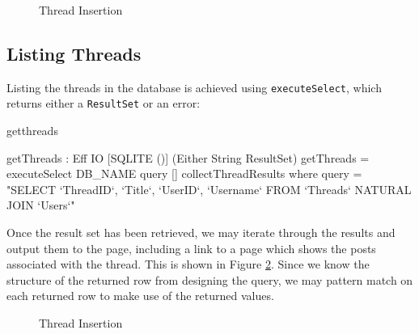 \begin{figure}[h]
\caption{Thread Insertion}
\label{fig:threadins}
\end{figure}

\subsection{Listing Threads}

Listing the threads in the database is achieved using 
\texttt{executeSelect}, which returns either a
\texttt{ResultSet} or an error:

\begin{SaveVerbatim}{getthreads}

getThreads : Eff IO [SQLITE ()] (Either String ResultSet)
getThreads = 
    executeSelect DB_NAME query [] collectThreadResults
 where query = "SELECT `ThreadID`, `Title`, `UserID`, 
         `Username` FROM `Threads` NATURAL JOIN `Users`"

\end{SaveVerbatim}
\noindent
{}

\noindent 
Once the result set has been retrieved, we may iterate through the
results and output them to the page, including a link to a page which shows the
posts associated with the thread. This is shown in Figure \ref{fig:traverse}.
Since we know the structure of the returned
row from designing the query, we may pattern match on each returned row to make
use of the returned values.


\begin{figure}[h]
\caption{Thread Insertion}
\label{fig:traverse}
\end{figure}

